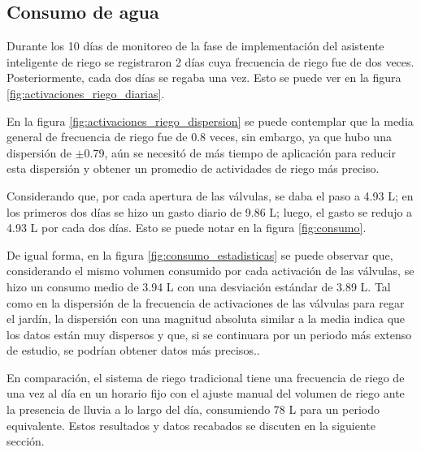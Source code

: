 \documentclass[pdflatex,sn-mathphys-num]{sn-jnl}%
\theoremstyle{thmstyleone}%
\theoremstyle{thmstyletwo}%
\theoremstyle{thmstylethree}%
\begin{document}
\begin{multicols}{2}
\justifying

\subsection*{Consumo de agua}
Durante los 10 días de monitoreo de la fase de implementación del asistente inteligente de riego se registraron 2 días cuya frecuencia de riego fue de dos veces. Posteriormente, cada dos días se regaba una vez. Esto se puede ver en la figura \ref{fig:activaciones_riego_diarias}.

En la figura \ref{fig:activaciones_riego_dispersion} se puede contemplar que la media general de frecuencia de riego fue de 0.8 veces, sin embargo, ya que hubo una dispersión de $\pm$0.79, aún se necesitó de más tiempo de aplicación para reducir esta dispersión y obtener un promedio de actividades de riego más preciso.

Considerando que, por cada apertura de las válvulas, se daba el paso a 4.93 L; en los primeros dos días se hizo un gasto diario de 9.86 L; luego, el gasto se redujo a 4.93 L por cada dos días. Esto se puede notar en la figura \ref{fig:consumo}.

De igual forma, en la figura \ref{fig:consumo_estadisticas} se puede observar que, considerando el mismo volumen consumido por cada activación de las válvulas, se hizo un consumo medio de 3.94 L con una desviación estándar de 3.89 L. Tal como en la dispersión de la frecuencia de activaciones de las válvulas para regar el jardín, la dispersión con una magnitud absoluta similar a la media indica que los datos están muy dispersos y que, si se continuara por un periodo más extenso de estudio, se podrían obtener datos más precisos.. 

En comparación, el sistema de riego tradicional tiene una frecuencia de riego de una vez al día en un horario fijo con el ajuste manual del volumen de riego ante la presencia de lluvia a lo largo del día, consumiendo 78 L para un periodo equivalente. Estos resultados y datos recabados se discuten en la siguiente sección.

\end{multicols}
\end{document}
